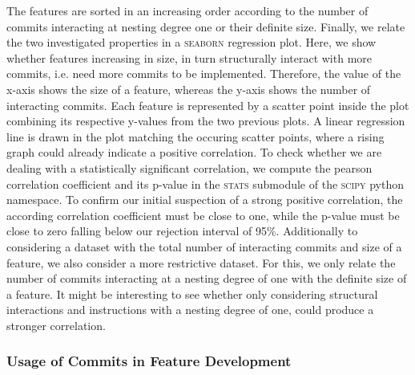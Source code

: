 The features are sorted in an increasing order according to the number of commits interacting at nesting degree one or their definite size.
Finally, we relate the two investigated properties in a \textsc{seaborn} regression plot.
Here, we show whether features increasing in size, in turn structurally interact with more commits, i.e. need more commits to be implemented.
Therefore, the value of the x-axis shows the size of a feature, whereas the y-axis shows the number of interacting commits.
Each feature is represented by a scatter point inside the plot combining its respective y-values from the two previous plots.
A linear regression line is drawn in the plot matching the occuring scatter points, where a rising graph could already indicate a positive correlation.
To check whether we are dealing with a statistically significant correlation, we compute the pearson correlation coefficient and its p-value in the \textsc{stats} submodule of the \textsc{scipy} python namespace.
To confirm our initial suspection of a strong positive correlation, the according correlation coefficient must be close to one, while the p-value must be close to zero falling below our rejection interval of 95\%.
Additionally to considering a dataset with the total number of interacting commits and size of a feature, we also consider a more restrictive dataset.
For this, we only relate the number of commits interacting at a nesting degree of one with the definite size of a feature.
It might be interesting to see whether only considering structural interactions and instructions with a nesting degree of one, could produce a stronger correlation.

\subsubsection*{Usage of Commits in Feature Development}

